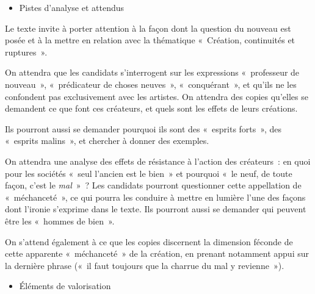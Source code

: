 {\vspace*{-18pt}

\begin{itemize}[label=\textbullet]
\item Pistes d'analyse et attendus
\end{itemize}

Le texte invite à porter attention à la façon dont la question du nouveau est posée et à
la mettre en relation avec la thématique «~Création, continuités et ruptures~».

On attendra que les candidats s'interrogent sur les expressions «~professeur de
nouveau~», «~prédicateur de choses neuves~», «~conquérant~», et qu'ils ne les
confondent pas exclusivement avec les artistes. On attendra des copies qu'elles se
demandent ce que font ces créateurs, et quels sont les effets de leurs créations.

Ils pourront aussi se demander pourquoi ils sont des «~esprits forts~», des «~esprits
malins~», et chercher à donner des exemples.

On attendra une analyse des effets de résistance à l'action des créateurs~: en quoi
pour les sociétés «~seul l'ancien est le bien~» et pourquoi «~le neuf, de toute façon,
c'est le \emph{mal}~»~? Les candidats pourront questionner cette appellation de
«~méchanceté~», ce qui pourra les conduire à mettre en lumière l'une des façons dont
l'ironie s'exprime dans le texte. Ils pourront aussi se demander qui peuvent être les
«~hommes de bien~».

On s'attend également à ce que les copies discernent la dimension féconde de cette
apparente «~méchanceté~» de la création, en prenant notamment appui sur la dernière
phrase («~il faut toujours que la charrue du mal y revienne~»).

\begin{itemize}[label=\textbullet]
\item Éléments de valorisation
\end{itemize}

}
